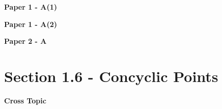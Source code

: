 \documentclass[12pt, a4paper]{article}
\begin{document}
\textbf{Paper 1 - A(1)}
\begin{enumx}[label=\arabic*.,start=28]
\item {}\label{DSE2018-CoreP1-Q08} 
\end{enumx}
\textbf{Paper 1 - A(2)}
\begin{enumx}[label=\arabic*.,start=29]
\item {}\label{DSE2017-CoreP1-Q10} 
\end{enumx}
\textbf{Paper 2 - A}
\begin{enumx}[label=\arabic*.,start=30]
\item {}\label{DSE2017-CoreP2-Q21} 
\item {}\label{DSE2021-CoreP2-Q22} 
\item {}\label{DSE2023-CoreP2-Q22} 
\end{enumx}




\section*{Section 1.6 - Concyclic Points \NF}\label{section:5-1-6}

\textbf{Cross Topic}
\begin{enumx}[label=\arabic*.,start=33]
\item {}\label{DSE2019-CoreP1-Q19} 
\end{enumx}
\end{document}
